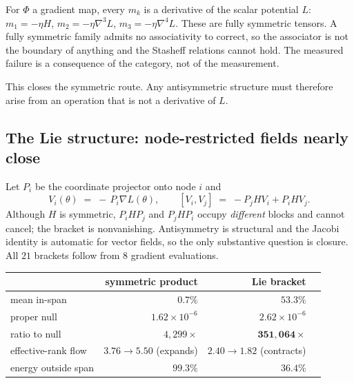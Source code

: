 \begin{proposition}
For $\Phi$ a gradient map, every $m_k$ is a derivative of the scalar potential
$L$: $m_1 = -\eta H$, $m_2 = -\eta\nabla^3 L$, $m_3 = -\eta\nabla^4 L$. These are
fully symmetric tensors. A fully symmetric family admits no associativity to
correct, so the associator is not the boundary of anything and the Stasheff
relations cannot hold. The measured failure is a consequence of the category,
not of the measurement.
\end{proposition}

This closes the symmetric route. Any antisymmetric structure must therefore
arise from an operation that is not a derivative of $L$.

\subsection{The Lie structure: node-restricted fields nearly close}

Let $P_i$ be the coordinate projector onto node $i$ and
\begin{equation}
  V_i(\theta) \;=\; -\,P_i\nabla L(\theta),
  \qquad
  [V_i,V_j] \;=\; -P_j H V_i + P_i H V_j .
  \label{eq:bracket}
\end{equation}
Although $H$ is symmetric, $P_iHP_j$ and $P_jHP_i$ occupy \emph{different}
blocks and cannot cancel; the bracket is nonvanishing. Antisymmetry is
structural and the Jacobi identity is automatic for vector fields, so the only
substantive question is closure. All $21$ brackets follow from $8$ gradient
evaluations.

\begin{center}
\begin{tabular}{lrrr}
\toprule
& symmetric product & Lie bracket \\
\midrule
mean in-span                & $0.7\%$ & $\mathbf{53.3\%}$ \\
proper null                 & $1.62{\times}10^{-6}$ & $2.62{\times}10^{-6}$ \\
ratio to null               & $4{,}299\times$ & $\mathbf{351{,}064\times}$ \\
effective-rank flow         & $3.76 \to 5.50$ (expands) & $2.40 \to 1.82$ (contracts) \\
energy outside span         & $99.3\%$ & $36.4\%$ \\
\bottomrule
\end{tabular}
\end{center}

